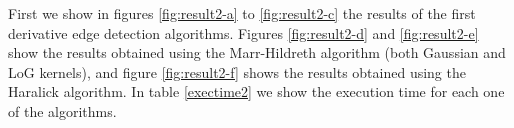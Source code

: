 \documentclass{ipol}
\numberwithin{equation}{section}
\numberwithin{table}{section}
\numberwithin{figure}{section}
\begin{document}
First we show in figures \ref{fig:result2-a} to \ref{fig:result2-c} the results of the first derivative edge detection algorithms. Figures \ref{fig:result2-d} and \ref{fig:result2-e} show the results obtained using the Marr-Hildreth algorithm (both Gaussian and LoG kernels), and figure \ref{fig:result2-f} shows the results obtained using the Haralick algorithm. In table \ref{exectime2} we show the execution time for each one of the algorithms. \\
\begin{figure}[h!]
	\centering
	\quad
	
	\quad


\end{figure}
\end{document}
